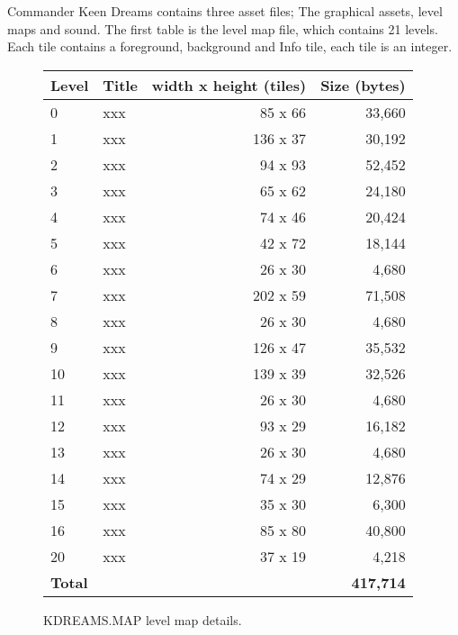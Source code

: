 \documentclass[book.tex]{subfiles}
\begin{document}
\label{asset_details}


Commander Keen Dreams contains three asset files; The graphical assets, level maps and sound. The first table is the level map file, which contains 21 levels. Each tile contains a foreground, background and Info tile, each tile is an integer. 

\begin{figure}[H]
\centering
{\renewcommand{\arraystretch}{1.2} %
\begin{tabularx}{\textwidth}[c]{|X|X|r|r|}
  \hline
  \textbf{Level} & \textbf{Title} & \textbf{width x height (tiles)} & \textbf{Size (bytes)}\\ \hline
	0 & xxx & 85 x 66 &  33,660 \\
	1 & xxx & 136 x 37 &   30,192 \\ 
	2 & xxx & 94 x 93 &   52,452 \\
	3 & xxx & 65 x 62 &  24,180 \\
	4 & xxx & 74 x 46 &  20,424 \\
	5 & xxx & 42 x 72 &   18,144 \\
	6 & xxx & 26 x 30 &   4,680 \\
	7 & xxx & 202 x 59 &  71,508 \\
	8 & xxx & 26 x 30 &  4,680 \\
	9 & xxx & 126 x 47 &  35,532 \\
	10 & xxx & 139 x 39 &  32,526 \\
	11 & xxx & 26 x 30 &  4,680 \\
	12 & xxx & 93 x 29 &  16,182 \\
	13 & xxx & 26 x 30 &  4,680 \\
	14 & xxx & 74 x 29 &  12,876 \\
	15 & xxx & 35 x 30 &  6,300 \\
	16 & xxx & 85 x 80 &  40,800 \\
	20 & xxx & 37 x 19 &  4,218 \\ \hline
	\textbf{Total} & \multicolumn{3}{r|}{\textbf{417,714}} \\ \hline
\end{tabularx}
}
\caption{KDREAMS.MAP level map details.}
\end{figure}
\end{document}
